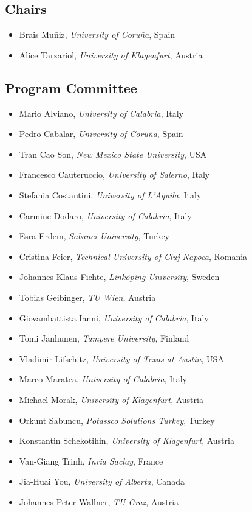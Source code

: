 \documentclass[
]{ceurart}
\begin{document}
\subsection*{Chairs}
\begin{itemize}
 \item Brais Muñiz, \emph{University of Coru\~na}, Spain
 \item Alice Tarzariol, \emph{University of Klagenfurt}, Austria
\end{itemize}


\subsection*{Program Committee}
\begin{itemize}
  \item Mario Alviano, \emph{University of Calabria}, Italy
  \item Pedro Cabalar, \emph{University of Coru\~na}, Spain
  \item Tran Cao Son, \emph{New Mexico State University}, USA
  \item Francesco Cauteruccio, \emph{University of Salerno}, Italy
  \item Stefania Costantini, \emph{University of L'Aquila}, Italy
  \item Carmine Dodaro, \emph{University of Calabria}, Italy
  \item Esra Erdem, \emph{Sabanci University}, Turkey
  \item Cristina Feier, \emph{Technical University of Cluj-Napoca}, Romania
  \item Johannes Klaus Fichte, \emph{Linköping University}, Sweden
  \item Tobias Geibinger, \emph{TU Wien}, Austria
  \item Giovambattista Ianni, \emph{University of Calabria}, Italy
  \item Tomi Janhunen, \emph{Tampere University}, Finland
  \item Vladimir Lifschitz, \emph{University of Texas at Austin}, USA
  \item Marco Maratea, \emph{University of Calabria}, Italy
  \item Michael Morak, \emph{University of Klagenfurt}, Austria
  \item Orkunt Sabuncu, \emph{Potassco Solutions Turkey}, Turkey
  \item Konstantin Schekotihin, \emph{University of Klagenfurt}, Austria
  \item Van-Giang Trinh, \emph{Inria Saclay}, France
  \item Jia-Huai You, \emph{University of Alberta}, Canada
  \item Johannes Peter Wallner, \emph{TU Graz}, Austria
\end{itemize}
\end{document}

